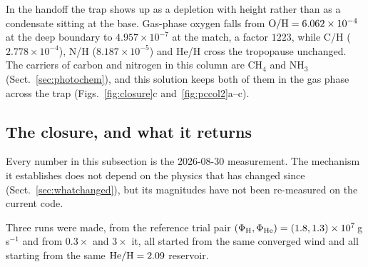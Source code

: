 \documentclass[english,a4paper]{my_memo}
\begin{document}
In the handoff the trap shows up as a depletion with height rather than as a
condensate sitting at the base. Gas-phase oxygen falls from
${\rm O/H} = 6.062\times10^{-4}$ at the deep boundary to
$4.957\times10^{-7}$ at the match, a factor $1223$, while C/H
($2.778\times10^{-4}$), N/H ($8.187\times10^{-5}$) and He/H cross the
tropopause unchanged. The carriers of carbon and nitrogen in this column are
CH$_4$ and NH$_3$ (Sect.~\ref{sec:photochem}), and this solution keeps both
of them in the gas phase across the trap (Figs.~\ref{fig:closure}c
and~\ref{fig:pccol2}a--c).

\subsection{The closure, and what it returns}

Every number in this subsection is the 2026-08-30 measurement. The mechanism
it establishes does not depend on the physics that has changed since
(Sect.~\ref{sec:whatchanged}), but its magnitudes have not been re-measured
on the current code.

Three runs were made, from the reference trial pair
$(\Phi_{\rm H},\Phi_{\rm He}) = (1.8, 1.3)\times10^{7}$\,g\,s$^{-1}$ and from
$0.3\times$ and $3\times$ it, all started from the same converged wind and
all starting from the same ${\rm He/H} = 2.09$ reservoir.
\end{document}
